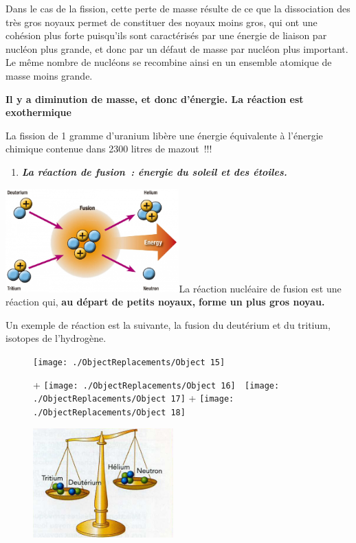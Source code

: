 Dans le cas de la fission, cette perte de masse résulte de ce que la
dissociation des très gros noyaux permet de constituer des noyaux moins
gros, qui ont une cohésion plus forte puisqu'ils sont caractérisés par
une énergie de liaison par nucléon plus grande, et donc par un défaut de
masse par nucléon plus important. Le même nombre de nucléons se
recombine ainsi en un ensemble atomique de masse moins grande.

\textbf{Il y a diminution de masse, et donc d'énergie. La réaction est
exothermique}

La fission de 1 gramme d'uranium libère une énergie équivalente à
l'énergie chimique contenue dans 2300 litres de mazout~!!!

\begin{enumerate}
\def\labelenumi{\alph{enumi})}
\tightlist
\item
  \emph{\textbf{La réaction de fusion~: énergie du soleil et des
  étoiles.}}
\end{enumerate}

\includegraphics[width=6.683cm,height=3.997cm]{Pictures/10000000000002BC000001A3F2B1BDBB4F71DAC0.jpg}La
réaction nucléaire de fusion est une réaction qui, \textbf{au départ de
petits noyaux,} \textbf{forme un plus gros noyau.}

Un exemple de réaction est la suivante, la fusion du deutérium et du
tritium, isotopes de l'hydrogène.

\begin{figure}
\centering
\texttt{[image: ./ObjectReplacements/Object 15]}
\caption{ +
\texttt{[image: ./ObjectReplacements/Object 16]}

\texttt{[image: ./ObjectReplacements/Object 17]}
+
\texttt{[image: ./ObjectReplacements/Object 18]}}
\end{figure}

\begin{figure}
\centering
\includegraphics[width=5.385cm,height=4.209cm]{Pictures/10000000000001DC00000174806216890CE122F5.jpg}
\caption{}
\end{figure}

